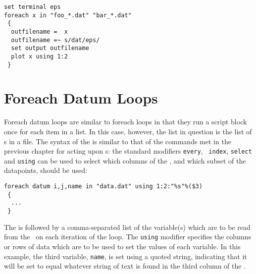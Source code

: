 \begin{verbatim}
set terminal eps
foreach x in "foo_*.dat" "bar_*.dat"
 {
  outfilename =  x
  outfilename =~ s/dat/eps/
  set output outfilename
  plot x using 1:2
 }
\end{verbatim}

\section{Foreach Datum Loops}
\label{sec:foreach_datum}

Foreach datum loops are similar to foreach loops in that they run a script
block once for each item in a list.  In this case, however, the list in
question is the list of \datapoint s in a file. The syntax of the
 is similar to that of the commands met in the previous
chapter for acting upon \datafile s: the standard modifiers {\tt every}, {\tt
index}, {\tt select} and {\tt using} can be used to select which columns of the
\datafile, and which subset of the datapoints, should be used:

\begin{verbatim}
foreach datum i,j,name in "data.dat" using 1:2:"%s"%($3)
 {
  ...
 }
\end{verbatim}

The  is followed by a comma-separated list of the
variable(s) which are to be read from the \datafile\ on each iteration of the
loop. The {\tt using} modifier specifies the columns or rows of data which are
to be used to set the values of each variable. In this example, the third
variable, {\tt name}, is set using a quoted string, indicating that it will be
set to equal whatever string of text is found in the third column of the
\datafile.


